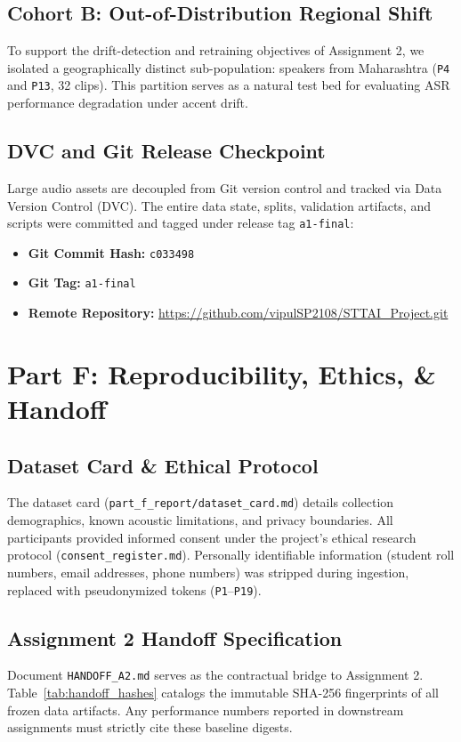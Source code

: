 \documentclass[10pt,journal,compsoc]{IEEEtran}
\begin{document}
\subsection{Cohort B: Out-of-Distribution Regional Shift}
To support the drift-detection and retraining objectives of Assignment 2, we isolated a geographically distinct sub-population: speakers from Maharashtra (\texttt{P4} and \texttt{P13}, 32 clips). This partition serves as a natural test bed for evaluating ASR performance degradation under accent drift.

\subsection{DVC and Git Release Checkpoint}
Large audio assets are decoupled from Git version control and tracked via Data Version Control (DVC). The entire data state, splits, validation artifacts, and scripts were committed and tagged under release tag \texttt{a1-final}:
\begin{itemize}
    \item \textbf{Git Commit Hash:} \texttt{c033498}
    \item \textbf{Git Tag:} \texttt{a1-final}
    \item \textbf{Remote Repository:} \url{https://github.com/vipulSP2108/STTAI_Project.git}
\end{itemize}

\section{Part F: Reproducibility, Ethics, \& Handoff}
\label{sec:part_f}

\subsection{Dataset Card \& Ethical Protocol}
The dataset card (\texttt{part\_f\_report/dataset_card.md}) details collection demographics, known acoustic limitations, and privacy boundaries. All participants provided informed consent under the project's ethical research protocol (\texttt{consent\_register.md}). Personally identifiable information (student roll numbers, email addresses, phone numbers) was stripped during ingestion, replaced with pseudonymized tokens (\texttt{P1}--\texttt{P19}).

\subsection{Assignment 2 Handoff Specification}
Document \texttt{HANDOFF\_A2.md} serves as the contractual bridge to Assignment 2. Table~\ref{tab:handoff_hashes} catalogs the immutable SHA-256 fingerprints of all frozen data artifacts. Any performance numbers reported in downstream assignments must strictly cite these baseline digests.
\end{document}
